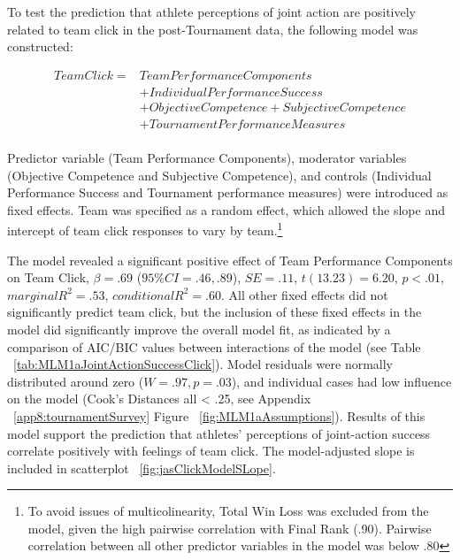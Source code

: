 \begin{CJK}{UTF8}{gbsn}
To test the prediction that athlete perceptions of joint action are positively
related to team click in the post-Tournament data, the following model was constructed:


  \begin{align*}
    Team Click =  & Team Performance Components\\
              & + Individual Performance Success \\
              & + Objective Competence + Subjective Competence\\
              & + TournamentPerformanceMeasures \\
  \end{align*}

\bigskip

Predictor variable (Team Performance Components), moderator variables (Objective Competence and Subjective Competence), and controls (Individual Performance Success and Tournament performance measures) were introduced as fixed effects.   Team was specified as a random effect, which allowed the slope and intercept of team click responses to vary by team.\footnote{To avoid issues of multicolinearity, Total Win Loss was excluded from the model, given the high pairwise correlation with Final Rank (.90). Pairwise correlation between all other predictor variables in the model was below .80}

The model revealed a significant positive effect of Team Performance Components on Team Click, $\beta = .69$ ($95\% CI =  .46, .89$), $SE = .11$, $t(13.23) = 6.20$, $p < .01$, $marginal R^2 = .53$, $conditional R^2 = .60$. All other fixed effects did not significantly predict team click, but the inclusion of these fixed effects in the model did significantly improve the overall model fit, as indicated by a comparison of AIC/BIC values between interactions of the model (see Table ~\ref{tab:MLM1aJointActionSuccessClick}).  Model residuals were normally distributed around zero ($W = .97, p = .03$), and individual cases had low influence on the model (Cook's Distances all < .25, see Appendix ~\ref{app8:tournamentSurvey} Figure ~\ref{fig:MLM1aAssumptions}). Results of this model support the prediction that athletes' perceptions of joint-action success correlate positively with feelings of team click.  The model-adjusted slope is included in scatterplot ~\ref{fig:jasClickModelSLope}.



\end{CJK}
